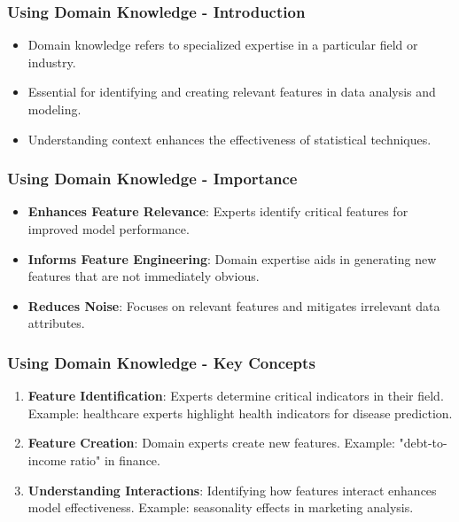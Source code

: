 \documentclass[aspectratio=169]{beamer}
\begin{document}
\begin{frame}[fragile]
    \frametitle{Using Domain Knowledge - Introduction}
    \begin{itemize}
        \item Domain knowledge refers to specialized expertise in a particular field or industry.
        \item Essential for identifying and creating relevant features in data analysis and modeling.
        \item Understanding context enhances the effectiveness of statistical techniques.
    \end{itemize}
\end{frame}

\begin{frame}[fragile]
    \frametitle{Using Domain Knowledge - Importance}
    \begin{itemize}
        \item \textbf{Enhances Feature Relevance}:
        Experts identify critical features for improved model performance.
        
        \item \textbf{Informs Feature Engineering}:
        Domain expertise aids in generating new features that are not immediately obvious.
        
        \item \textbf{Reduces Noise}:
        Focuses on relevant features and mitigates irrelevant data attributes.
    \end{itemize}
\end{frame}

\begin{frame}[fragile]
    \frametitle{Using Domain Knowledge - Key Concepts}
    \begin{enumerate}
        \item \textbf{Feature Identification}:
        Experts determine critical indicators in their field. Example: healthcare experts highlight health indicators for disease prediction.
        
        \item \textbf{Feature Creation}:
        Domain experts create new features. Example: "debt-to-income ratio" in finance.
        
        \item \textbf{Understanding Interactions}:
        Identifying how features interact enhances model effectiveness. Example: seasonality effects in marketing analysis.
    \end{enumerate}
\end{frame}
\end{document}
